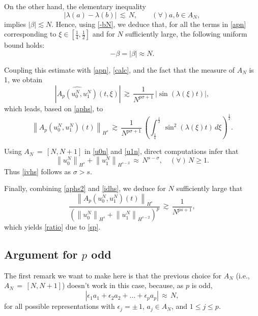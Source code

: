 \documentclass{amsart}
\begin{document}
On the other hand, the elementary inequality
\[
\left|\lambda(a)-\lambda(b)\right|\,\lesssim \,N, \qquad (\forall) a,b \in A_N, 
\]
implies $|\beta|\lesssim N$. Hence, using \eqref{-bN}, we deduce that, for all the terms in \eqref{apn} corresponding to $\xi \in \left[\frac{1}{4},\frac{1}{2}\right]$ and for $N$ sufficiently large, the following uniform bound holds:
\begin{equation}
-\beta= |\beta| \approx N.
\label{beven}
\end{equation}

Coupling this estimate with \eqref{apn}, \eqref{calc}, and the fact that the measure of $A_N$ is 1, we obtain
\[
\left|\widehat{A_p(u^N_0,u^N_1)}(t,\xi)\right|\,\gtrsim\,\frac{1}{N^{p\sigma+1}}\,|\sin(\lambda(\xi)t)|,
\]  
which leads, based on \eqref{aphs}, to
\begin{equation}
\left\|A_{p}\left(u_0^N,u_1^N\right)(t)\right\|_{H^s}\,\gtrsim\,  \frac{1}{N^{p\sigma+1}}\, \left(\int_\frac{1}{4}^\frac{1}{2}\,\sin^2(\lambda(\xi)t)\,d\xi\right)^\frac{1}{2}.
\label{aphs2}
\end{equation} 

Using $A_N\,=\,[N,N+1]$ in \eqref{u0n} and \eqref{u1n}, direct computations infer that 
\begin{equation}
\left\|u_0^N\right\|_{H^{s}} + \left\|u_1^N\right\|_ {H^{{s}-2}}\,\approx\,N^{s-\sigma},\quad (\forall)\,N\geq 1.\label{idhs} 
\end{equation}
Thus \eqref{ivhs} follows as $\sigma>s$. 

Finally,  combining \eqref{aphs2} and \eqref{idhs}, we deduce for $N$ sufficiently large that
\begin{equation}
 \frac{\left\|A_{p}(u_0^N,u_1^N)(t)\right\|_{H^s}}{\left(\left\|u_0^N\right\|_{H^{s}} + \left\|u_1^N\right\|_ {H^{{s}-2}}\right)^p}\,\gtrsim\, \frac{1}{N^{ps+1}},\end{equation}
which yields \eqref{ratio} due to \eqref{sp}.

\subsection{Argument for $p$ odd}
The first remark we want to make here is that the previous choice for $A_N$ (i.e., $A_N\,=\,[N,N+1]$) doesn't work in this case, because, as $p$ is odd, 
\[
\left|\epsilon_1 a_1+\epsilon_2 a_2+ \ldots+\epsilon_p a_p\right|\,\approx\,N, 
\]
for all possible representations with $\epsilon_j=\pm \,1$, $a_j\in A_N$,  and $1\leq j\leq p$. 
\end{document}

